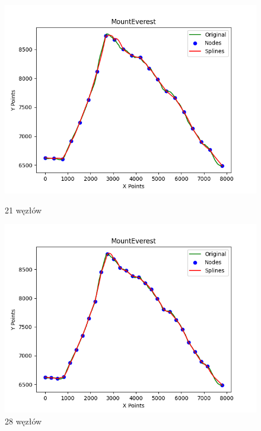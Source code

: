 \documentclass{article}
\begin{document}
\begin{figure}[H]
    \centering
    \begin{minipage}[b]{0.49\textwidth}
        \centering
        \includegraphics[width=\textwidth]{plots/MountEverest_splines_21.png}
        \caption{21 węzłów}
        \label{fig:21nodes}
    \end{minipage}
    \hfill
    \begin{minipage}[b]{0.49\textwidth}
        \centering
        \includegraphics[width=\textwidth]{plots/MountEverest_splines_28.png}
        \caption{28 węzłów}
        \label{fig:28nodes}
    \end{minipage}
\end{figure}
\end{document}
